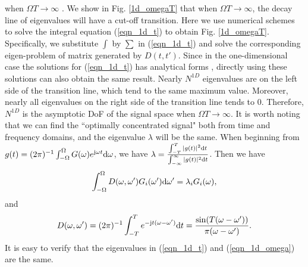 \documentclass[12pt,draftclsnofoot,journal,onecolumn]{IEEEtran}
\begin{document}
	when $\Omega T \rightarrow \infty$ \cite{slepian1961prolate}. We show in Fig. \ref{1d_omegaT} that when $\Omega T \rightarrow \infty$, the decay line of eigenvalues will have a cut-off transition. {\color{red} Here we use numerical schemes to solve the integral equation (\ref{eqn_1d_t}) to obtain Fig. \ref{1d_omegaT}. Specifically, we substitute $\int$ by $\sum$ in (\ref{eqn_1d_t}) and solve the corresponding eigen-problem of matrix generated by $D(t,t')$. Since in the one-dimensional case the solutions for (\ref{eqn_1d_t}) has analytical forms \cite{slepian1961prolate}, directly using these solutions can also obtain the same result.} Nearly $N^{1D}$ eigenvalues are on the left side of the transition line, which tend to the same maximum value. Moreover, nearly all eigenvalues on the right side of the transition line tends to 0. Therefore, $N^{1D}$ is the asymptotic DoF of the signal space when $\Omega T \rightarrow \infty$. {\color{red}It is worth noting that we can find the ``optimally concentrated signal" both from time and frequency domains, and the eigenvalue $\lambda$ will be the same. When beginning from $g(t) = (2\pi)^{-1}\int_{-\Omega}^{\Omega}G(\omega)e^{{\rm j}\omega t} {\rm d}\omega$, we have $\lambda = \frac{\int_{-T}^{T}|g(t)|^2{\rm d}t}{\int_{-\infty}^{\infty}|g(t)|^2{\rm d}t}$. Then we have 
	\begin{equation}
	\begin{aligned}
		\int_{-\Omega}^{\Omega}D(\omega,\omega')G_i(\omega'){\rm d}\omega' = \lambda_i G_i(\omega),
	\end{aligned}
	\label{eqn_1d_omega}
	\end{equation}
	and
	\begin{equation}
		\begin{aligned}
			D(\omega,\omega') = (2\pi)^{-1}\int_{-T}^T e^{-{\rm j}t(\omega-\omega')}{\rm d}t = \frac{\sin(T(\omega-\omega'))}{\pi(\omega-\omega')}.
		\end{aligned}
	\end{equation}
	It is easy to verify that the eigenvalues in (\ref{eqn_1d_t}) and (\ref{eqn_1d_omega}) are the same.
	}
	
\end{document}

